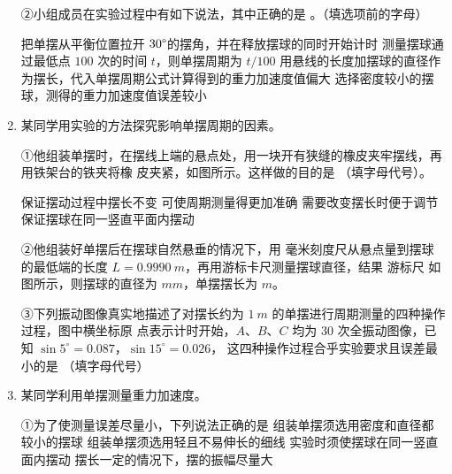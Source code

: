 \begin{enumerate}
②小组成员在实验过程中有如下说法，其中正确的是
 。（填选项前的字母）

\fourchoices
{把单摆从平衡位置拉开 $ 30 \degree $的摆角，并在释放摆球的同时开始计时}
{测量摆球通过最低点 $ 100 $ 次的时间 $ t $，则单摆周期为 $ t/100 $}
{用悬线的长度加摆球的直径作为摆长，代入单摆周期公式计算得到的重力加速度值偏大}
{选择密度较小的摆球，测得的重力加速度值误差较小}




\newpage
\item
{}
某同学用实验的方法探究影响单摆周期的因素。
\begin{figure}[h!]
\centering

\end{figure}

①他组装单摆时，在摆线上端的悬点处，用一块开有狭缝的橡皮夹牢摆线，再用铁架台的铁夹将橡
皮夹紧，如图所示。这样做的目的是
（填字母代号）。

\fourchoices
{保证摆动过程中摆长不变}
{可使周期测量得更加准确}
{需要改变摆长时便于调节}
{保证摆球在同一竖直平面内摆动}

②他组装好单摆后在摆球自然悬垂的情况下，用
毫米刻度尺从悬点量到摆球的最低端的长度
$ L=0.9990 \ m $，再用游标卡尺测量摆球直径，结果
游标尺
如图所示，则摆球的直径为  
$ mm $，单摆摆长为
$ m $。
\begin{figure}[h!]
\centering

\end{figure}

③下列振动图像真实地描述了对摆长约为 $ 1 \ m $ 的单摆进行周期测量的四种操作过程，图中横坐标原
点表示计时开始，$ A $、$ B $、$ C $ 均为 $ 30 $ 次全振动图像，已知 $ \sin 5 ^{ \circ } =0.087 $，$ \sin 15 ^{ \circ } =0.026 $，
这四种操作过程合乎实验要求且误差最小的是  （填字母代号） 
\begin{figure}[h!]
\centering

\end{figure}



\newpage
\item 
{}
某同学利用单摆测量重力加速度。
\begin{figure}[h!]
\centering

\end{figure}

①为了使测量误差尽量小，下列说法正确的是  
\fourchoices
{组装单摆须选用密度和直径都较小的摆球}
{组装单摆须选用轻且不易伸长的细线}
{实验时须使摆球在同一竖直面内摆动}
{摆长一定的情况下，摆的振幅尽量大}


\end{enumerate}
